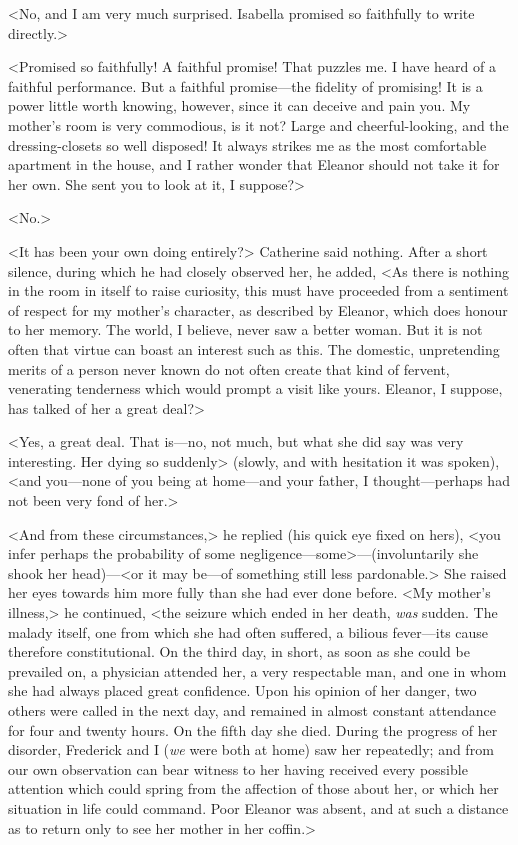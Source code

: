  <No, and I am very much surprised. Isabella promised so faithfully to write directly.> 

 <Promised so faithfully! A faithful promise! That puzzles me. I have heard of a faithful performance. But a faithful promise—the fidelity of promising! It is a power little worth knowing, however, since it can deceive and pain you. My mother's room is very commodious, is it not? Large and cheerful-looking, and the dressing-closets so well disposed! It always strikes me as the most comfortable apartment in the house, and I rather wonder that Eleanor should not take it for her own. She sent you to look at it, I suppose?> 

 <No.> 

 <It has been your own doing entirely?> Catherine said nothing. After a short silence, during which he had closely observed her, he added, <As there is nothing in the room in itself to raise curiosity, this must have proceeded from a sentiment of respect for my mother's character, as described by Eleanor, which does honour to her memory. The world, I believe, never saw a better woman. But it is not often that virtue can boast an interest such as this. The domestic, unpretending merits of a person never known do not often create that kind of fervent, venerating tenderness which would prompt a visit like yours. Eleanor, I suppose, has talked of her a great deal?> 

 <Yes, a great deal. That is—no, not much, but what she did say was very interesting. Her dying so suddenly> (slowly, and with hesitation it was spoken), <and you—none of you being at home—and your father, I thought—perhaps had not been very fond of her.> 

 <And from these circumstances,> he replied (his quick eye fixed on hers), <you infer perhaps the probability of some negligence—some>—(involuntarily she shook her head)—<or it may be—of something still less pardonable.> She raised her eyes towards him more fully than she had ever done before. <My mother's illness,> he continued, <the seizure which ended in her death, \textit{was} sudden. The malady itself, one from which she had often suffered, a bilious fever—its cause therefore constitutional. On the third day, in short, as soon as she could be prevailed on, a physician attended her, a very respectable man, and one in whom she had always placed great confidence. Upon his opinion of her danger, two others were called in the next day, and remained in almost constant attendance for four and twenty hours. On the fifth day she died. During the progress of her disorder, Frederick and I (\textit{we} were both at home) saw her repeatedly; and from our own observation can bear witness to her having received every possible attention which could spring from the affection of those about her, or which her situation in life could command. Poor Eleanor was absent, and at such a distance as to return only to see her mother in her coffin.> 

